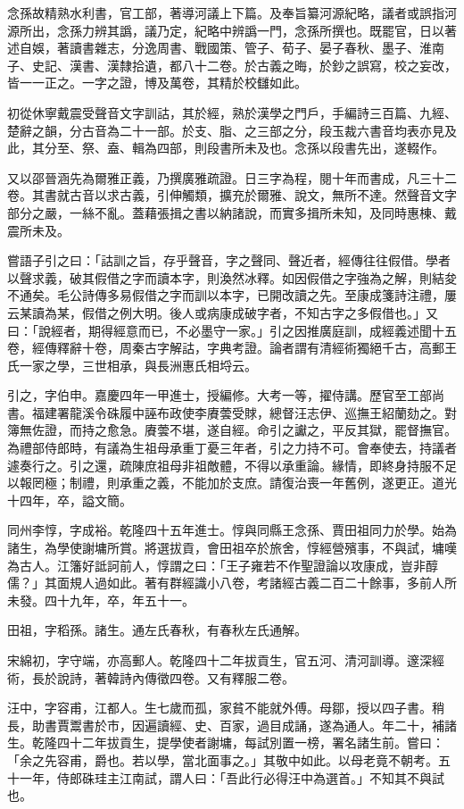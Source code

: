 \begin{pinyinscope}
念孫故精熟水利書，官工部，著導河議上下篇。及奉旨纂河源紀略，議者或誤指河源所出，念孫力辨其譌，議乃定，紀略中辨譌一門，念孫所撰也。既罷官，日以著述自娛，著讀書雜志，分逸周書、戰國策、管子、荀子、晏子春秋、墨子、淮南子、史記、漢書、漢隸拾遺，都八十二卷。於古義之晦，於鈔之誤寫，校之妄改，皆一一正之。一字之證，博及萬卷，其精於校讎如此。

初從休寧戴震受聲音文字訓詁，其於經，熟於漢學之門戶，手編詩三百篇、九經、楚辭之韻，分古音為二十一部。於支、脂、之三部之分，段玉裁六書音均表亦見及此，其分至、祭、盍、輯為四部，則段書所未及也。念孫以段書先出，遂輟作。

又以邵晉涵先為爾雅正義，乃撰廣雅疏證。日三字為程，閱十年而書成，凡三十二卷。其書就古音以求古義，引伸觸類，擴充於爾雅、說文，無所不達。然聲音文字部分之嚴，一絲不亂。蓋藉張揖之書以納諸說，而實多揖所未知，及同時惠棟、戴震所未及。

嘗語子引之曰：「詁訓之旨，存乎聲音，字之聲同、聲近者，經傳往往假借。學者以聲求義，破其假借之字而讀本字，則渙然冰釋。如因假借之字強為之解，則結夋不通矣。毛公詩傳多易假借之字而訓以本字，已開改讀之先。至康成箋詩注禮，屢云某讀為某，假借之例大明。後人或病康成破字者，不知古字之多假借也。」又曰：「說經者，期得經意而已，不必墨守一家。」引之因推廣庭訓，成經義述聞十五卷，經傳釋辭十卷，周秦古字解詁，字典考證。論者謂有清經術獨絕千古，高郵王氏一家之學，三世相承，與長洲惠氏相埒云。

引之，字伯申。嘉慶四年一甲進士，授編修。大考一等，擢侍講。歷官至工部尚書。福建署龍溪令硃履中誣布政使李賡蕓受賕，總督汪志伊、巡撫王紹蘭劾之。對簿無佐證，而持之愈急。賡蕓不堪，遂自經。命引之讞之，平反其獄，罷督撫官。為禮部侍郎時，有議為生祖母承重丁憂三年者，引之力持不可。會奉使去，持議者遽奏行之。引之還，疏陳庶祖母非祖敵體，不得以承重論。緣情，即終身持服不足以報罔極；制禮，則承重之義，不能加於支庶。請復治喪一年舊例，遂更正。道光十四年，卒，謚文簡。

同州李惇，字成裕。乾隆四十五年進士。惇與同縣王念孫、賈田祖同力於學。始為諸生，為學使謝墉所賞。將選拔貢，會田祖卒於旅舍，惇經營殯事，不與試，墉嘆為古人。江籓好詆訶前人，惇謂之曰：「王子雍若不作聖證論以攻康成，豈非醇儒？」其面規人過如此。著有群經識小八卷，考諸經古義二百二十餘事，多前人所未發。四十九年，卒，年五十一。

田祖，字稻孫。諸生。通左氏春秋，有春秋左氏通解。

宋綿初，字守端，亦高郵人。乾隆四十二年拔貢生，官五河、清河訓導。邃深經術，長於說詩，著韓詩內傳徵四卷。又有釋服二卷。

汪中，字容甫，江都人。生七歲而孤，家貧不能就外傅。母鄒，授以四子書。稍長，助書賈鬻書於市，因遍讀經、史、百家，過目成誦，遂為通人。年二十，補諸生。乾隆四十二年拔貢生，提學使者謝墉，每試別置一榜，署名諸生前。嘗曰：「余之先容甫，爵也。若以學，當北面事之。」其敬中如此。以母老竟不朝考。五十一年，侍郎硃珪主江南試，謂人曰：「吾此行必得汪中為選首。」不知其不與試也。


\end{pinyinscope}
